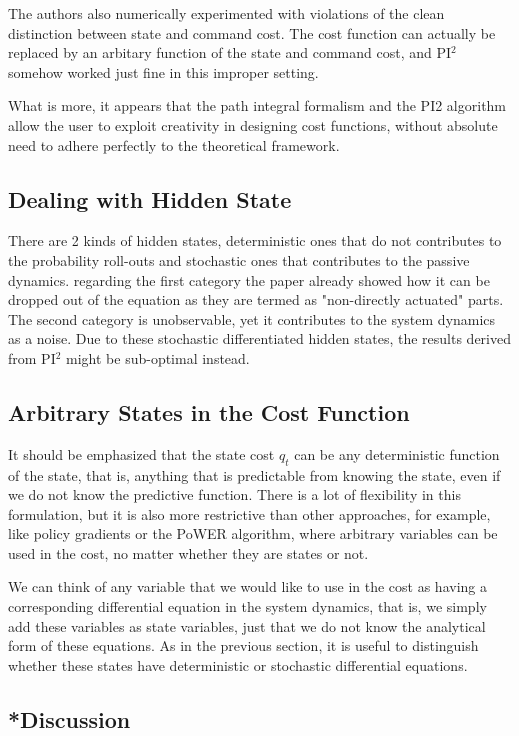 \documentclass[journal]{IEEEtran}
\begin{document}
The authors also numerically experimented with violations of the clean distinction between state and
command cost. The cost function can actually be replaced by an arbitary function of the state and command cost, and PI$^2$ somehow worked just fine in this improper setting.


What is more, it appears that the path integral formalism and the PI2 algorithm allow the user to exploit creativity in designing cost functions, without absolute need to adhere perfectly to the theoretical framework.


\subsection{Dealing with Hidden State}

There are 2 kinds of hidden states, deterministic ones that do not contributes to the probability roll-outs and stochastic ones that contributes to the passive dynamics. regarding the first category the paper already showed how it can be dropped out of the equation 
as they are termed as "non-directly actuated" parts. The second category is unobservable, yet it contributes to the system dynamics as a noise. Due to these stochastic differentiated hidden states, the results derived 
from PI$^2$ might be sub-optimal instead.


\subsection{Arbitrary States in the Cost Function}

It should be emphasized that the state cost $q_t$ can be any deterministic function of the state, that is, anything that is predictable from knowing the state, even if we do not know the predictive function. 
There is a lot of flexibility in this formulation, but it is also more restrictive than other approaches,
 for example, like policy gradients or the PoWER algorithm, where arbitrary variables can be used in the cost, no matter whether they are states or not.

 We can think of any variable that we would like to use in the cost as having a corresponding differential equation in the system dynamics, that is, we simply add these variables as state variables, just that we do not know the analytical form of these equations. 
 As in the previous section, it is useful to distinguish whether these states have deterministic or stochastic differential equations.

\subsection{*Discussion}
\end{document}
